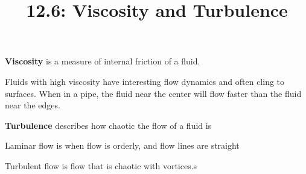 \documentclass{article}
\title{12.6: Viscosity and Turbulence}
\begin{document}
\maketitle

\begin{definition}[Viscosity]
\textbf{Viscosity} is a measure of internal friction of a fluid. 
\end{definition}
Fluids with high viscosity have interesting flow dynamics and often cling to surfaces. When in a pipe, the fluid near the center will flow faster than the fluid near the edges.

\begin{definition}[Turbulence]
\textbf{Turbulence} describes how chaotic the flow of a fluid is 
\end{definition}

Laminar flow is when flow is orderly, and flow lines are straight

Turbulent flow is flow that is chaotic with vortices.s
\end{document}
